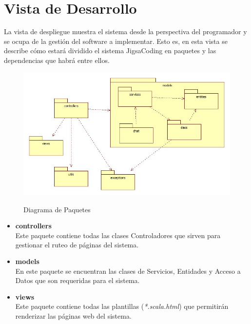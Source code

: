 \section{Vista de Desarrollo}
La vista de despliegue muestra el sistema desde la perspectiva del programador y se ocupa de la gestión del software a implementar. Esto es, en esta vista se describe cómo estará dividido el sistema JigsaCoding en paquetes y las dependencias que habrá entre ellos.
\begin{figure}[!h]
  \centering
  \includegraphics[scale=0.6]{figuras/sad/diagrama_de_paquetes.jpg}\\
  \caption{Diagrama de Paquetes}\label{fig:diagrama_de_paquetes}
\end{figure}
\begin{itemize}
  \item \textbf{controllers}\\Este paquete contiene todas las clases Controladores que sirven para gestionar el ruteo de páginas del sistema.
  \item \textbf{models}\\En este paquete se encuentran las clases de Servicios, Entidades y Acceso a Datos que son requeridas para el sistema.
  \item \textbf{views}\\Este paquete contiene todas las plantillas (\emph{*.scala.html}) que permitirán renderizar las páginas web del sistema.
\end{itemize}
\clearpage
